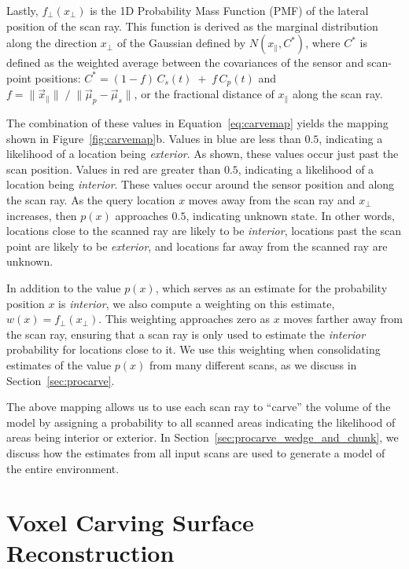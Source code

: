 \documentclass[12pt,onecolumn,oneside]{book}
\begin{document}
Lastly, $f_{\perp}(x_{\perp})$ is the 1D Probability Mass Function (PMF) of the lateral position of the scan ray.  This function is derived as the marginal distribution along the direction $x_{\perp}$ of the Gaussian defined by $N(x_{\parallel}, C^*)$, where $C^*$ is defined as the weighted average between the covariances of the sensor and scan-point positions:  $C^* = ( 1-f ) \,  C_s(t) \; + \; f \, C_p(t)$ and $f = \| \vec{x}_{\parallel} \| \; / \; \| \vec{\mu}_p - \vec{\mu}_s \|$, or the fractional distance of $x_{\parallel}$ along the scan ray.

The combination of these values in Equation~\ref{eq:carvemap} yields the mapping shown in Figure~\ref{fig:carvemap}b.  Values in blue are less than $0.5$, indicating a likelihood of a location being {\it exterior}.  As shown, these values occur just past the scan position.  Values in red are greater than $0.5$, indicating a likelihood of a location being {\it interior}.  These values occur around the sensor position and along the scan ray.  As the query location $x$ moves away from the scan ray and $x_{\perp}$ increases, then $p(x)$ approaches $0.5$, indicating unknown state.  In other words, locations close to the scanned ray are likely to be {\it interior}, locations past the scan point are likely to be {\it exterior}, and locations far away from the scanned ray are unknown.

In addition to the value $p(x)$, which serves as an estimate for the probability position $x$ is {\it interior}, we also compute a weighting on this estimate, $w(x) = f_{\perp}(x_{\perp})$.  This weighting approaches zero as $x$ moves farther away from the scan ray, ensuring that a scan ray is only used to estimate the {\it interior} probability for locations close to it.  We use this weighting when consolidating estimates of the value $p(x)$ from many different scans, as we discuss in Section~\ref{sec:procarve}.

The above mapping allows us to use each scan ray to ``carve'' the volume of the model by assigning a probability to all scanned areas indicating the likelihood of areas being interior or exterior.  In Section~\ref{sec:procarve_wedge_and_chunk}, we discuss how the estimates from all input scans are used to generate a model of the entire environment.  

\section{Voxel Carving Surface Reconstruction}
\label{sec:3dv2013}
\end{document}
